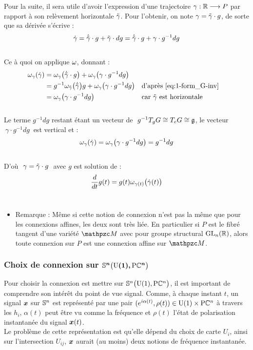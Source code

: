 Pour la suite, il sera utile d'avoir l'expression d'une trajectoire $\gamma:\R\lr P$ par rapport à son relèvement horizontale $\Tilde{\gamma}$. Pour l'obtenir, on note  $\gamma = \Tilde{\gamma}\cdot g$, de sorte que sa dérivée s'écrive :
\[\dot{\gamma} = \dot{\Tilde{\gamma}}\cdot g + \Tilde{\gamma}\cdot dg = \dot{\Tilde{\gamma}}\cdot g + \gamma \cdot g^{-1}dg\]
\\
Ce à quoi on applique $\conn$, donnant :
\begin{align*}
	\conn_\gamma(\dot{\gamma}) &= \conn_\gamma\big( \dot{\Tilde{\gamma}}\cdot g \big) + \conn_\gamma \big( \gamma \cdot g^{-1}dg \big) \\
	&= g^{-1}\conn_{\Tilde{\gamma}}\big(\dot{\Tilde{\gamma}} \big) g + \conn_\gamma \big( \gamma \cdot g^{-1}dg \big)   &  &\text{d'après \eqref{eq:1-form_G-inv}} \\
	&= \conn_\gamma \big( \gamma \cdot g^{-1}dg \big)  &  &\text{car $\Tilde{\gamma}$ est horizontale}
\end{align*}
\\
Le terme $g^{-1}dg$ restant étant un vecteur de $\ g^{-1}\tg[g]{G}\cong \tg[e]{G}\cong \mathfrak{g}$, le vecteur $\ \gamma \cdot g^{-1}dg\ $ est vertical et :
\[\conn_\gamma(\dot{\gamma}) = \conn_\gamma \big( \gamma \cdot g^{-1}dg \big) = g^{-1}dg\]
\\
D'où $\ \gamma = \Tilde{\gamma}\cdot g\ $ avec $g$ est solution de :
\begin{equation} \label{eq:deviation2hozi}
	\frac{d}{dt}g(t)  = g(t) \conn_{\gamma(t)}\big( \dot{\gamma}(t) \big)
\end{equation}
\\
\begin{itemize}
	
	\item Remarque : Même si cette notion de connexion n'est pas la même que pour les connexions affines, les deux sont très liée. En particulier si $P$ est le fibré tangent d'une variété $\manu$ avec pour groupe structural $\GL_n(\R)$, alors toute connexion sur $P$ est une connexion affine sur $\manu$.
	
\end{itemize}
\skipl



\subsubsection{Choix de connexion sur $\bf{\VFP}$}\label{subsec:conn2SUPC}

Pour choisir la connexion est mettre sur $\VFP$, il est important de comprendre son intérêt du point de vue signal.
Comme, à chaque instant $t$, un signal $\x$ sur $\S{n}$ est représenté par une pair $(e^{i\alpha(t)}, \rho(t))\in\U{1}\times\PC{n}$ à travers les $h_i$, $\alpha(t)$ peut être vu comme la fréquence et $\rho(t)$ l'état de polarisation instantanée du signal $\x(t)$.
\\
Le problème de cette représentation est qu'elle dépend du choix de carte $U_i$, ainsi sur l'intersection $U_{ij}$, $\x$ aurait (au moins) deux notions de fréquence instantanée.
\\

